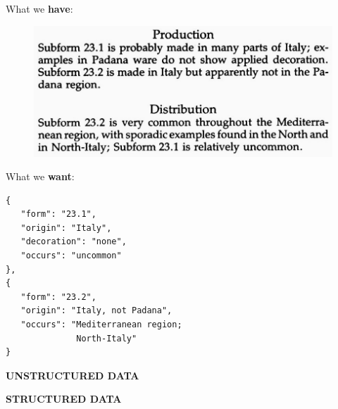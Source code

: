 \documentclass[xcolor=x11names, aspectratio=169,usenames,dvipsnames]{beamer}
\begin{document}
\begin{frame}[fragile]{}
\begin{minipage}[t]{0.45\textwidth}
What we \textbf{have}:\medskip

\begin{figure}
\includegraphics[width=1.0\textwidth]{img/consp_ex.jpg}
\end{figure}
\end{minipage}\hfill\pause
\begin{minipage}[t]{0.45\textwidth}
What we \textbf{want}:\medskip
{\scriptsize
\begin{verbatim}
{
   "form": "23.1",
   "origin": "Italy",
   "decoration": "none",
   "occurs": "uncommon"
},
{
   "form": "23.2",
   "origin": "Italy, not Padana",
   "occurs": "Mediterranean region;
              North-Italy"
}
\end{verbatim}
}
\end{minipage}\pause\medskip

\begin{minipage}[t]{0.45\textwidth}
\begin{center}
\alert{\textbf{UNSTRUCTURED DATA}}
\end{center}
\end{minipage}\hfill
\begin{minipage}[t]{0.45\textwidth}
\begin{center}
\alert{\textbf{STRUCTURED DATA}}
\end{center}
\end{minipage}
\end{frame}

\end{document}
